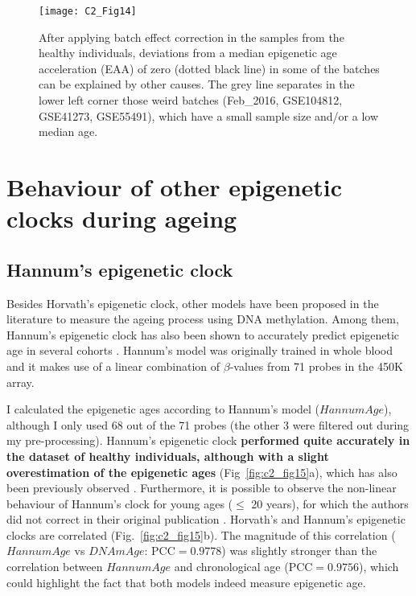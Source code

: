 \begin{figure}[htbp!] 
	\centering
	\texttt{[image: C2\_Fig14]}
	\vspace*{2mm}    
	\caption[Causes of deviation from the expected EAA distribution in the control model]{After applying batch effect correction in the samples from the healthy individuals, deviations from a median epigenetic age acceleration (EAA) of zero (dotted black line) in some of the batches can be explained by other causes. The grey line separates in the lower left corner those weird batches (Feb\_2016, GSE104812, GSE41273, GSE55491), which have a small sample size and/or a low median age.}
	\label{fig:c2_fig14}
\end{figure}


\section{Behaviour of other epigenetic clocks during ageing}

\smallskip

\subsection{Hannum's epigenetic clock}

Besides Horvath's epigenetic clock, other models have been proposed in the literature to measure the ageing process using DNA methylation. Among them, Hannum's epigenetic clock has also been shown to accurately predict epigenetic age in several cohorts \citep{Chen2016,Marioni2015,Horvath2016,Marioni2018,Perna2016,Irvin2018}. Hannum's model was originally trained in whole blood and it makes use of a linear combination of $\beta$-values from 71 probes in the 450K array. 

\bigskip

I calculated the epigenetic ages according to Hannum's model ($HannumAge$), although I only used 68 out of the 71 probes (the other 3 were filtered out during my pre-processing). Hannum's epigenetic clock \textbf{performed quite accurately in the dataset of healthy individuals, although with a slight overestimation of the epigenetic ages} (Fig~\ref{fig:c2_fig15}a), which has also been previously observed \citep{Marioni2015}. Furthermore, it is possible to observe the non-linear behaviour of Hannum's clock for young ages ($\leq$ 20 years), for which the authors did not correct in their original publication \citep{Hannum2013}. Horvath's and Hannum's epigenetic clocks are correlated (Fig.~\ref{fig:c2_fig15}b). The magnitude of this correlation ($HannumAge$ vs $DNAmAge$: $\text{PCC} = 0.9778$) was slightly stronger than the correlation between $HannumAge$ and chronological age ($\text{PCC} = 0.9756$), which could highlight the fact that both models indeed  measure epigenetic age.


